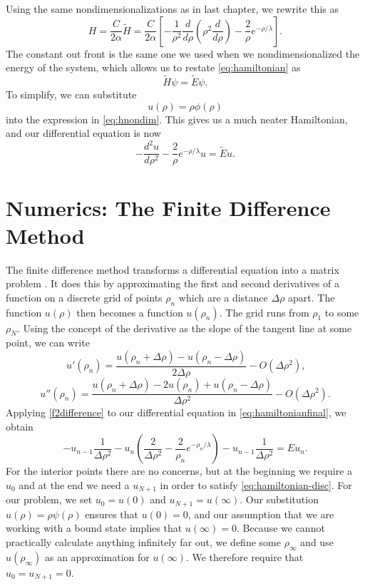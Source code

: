 \documentclass[12pt,twoside]{reedthesis}
\newcommand{\eqn}[1]{\begin{equation}#1\end{equation}}
\begin{document}
Using the same nondimensionalizations as in last chapter, we rewrite this as 
\eqn{
H=\frac{C}{2\alpha}\tilde{H} = \frac{C}{2\alpha} \left[- \frac{1}{\rho^2}\frac{d}{d\rho}\left(\rho^2\frac{d}{d\rho}\right) - \frac{2}{\rho}e^{-\rho/\lambda}\right]\mbox{.}
\label{eq:hnondim}
}
The constant out front is the same one we used when we nondimensionalized the energy of the system, which allows us to restate \eqref{eq:hamiltonian} as
\eqn{
\tilde{H}\psi = \tilde{E}\psi\mbox{.}
}
To simplify, we can substitute 
\eqn{
u(\rho)=\rho \phi(\rho)}
into the expression in \eqref{eq:hnondim}\cite{griffiths_introduction_2005}. This gives us a much neater Hamiltonian, and our differential equation is now
\eqn{
-\frac{d^2 u }{d \rho^2} - \frac{2}{\rho}e^{-\rho/\lambda}u = \tilde{E} u\mbox{.}
\label{eq:hamiltonianfinal}
}

\section{Numerics: The Finite Difference Method}
The finite difference method transforms a differential equation into a matrix problem \cite{numerical_recipes}. It does this by approximating the first and second derivatives of a function on a discrete grid of points $\rho_n$ which are a distance $\Delta \rho$ apart. The function $u(\rho)$ then becomes a function $u(\rho_n)$. The grid runs from $\rho_1$ to some $\rho_N$. Using the concept of the derivative as the slope of the tangent line at some point, we can write
\eqn{
u'(\rho_n) = \frac{u(\rho_n + \Delta \rho) - u(\rho_n - \Delta \rho)}{2 \Delta \rho} - O(\Delta{\rho}^2)\mbox{,}
\label{fdifference}
}
\eqn{
u''(\rho_n) = \frac{u(\rho_n + \Delta \rho) - 2 u(\rho_n) + u(\rho_n - \Delta \rho)}{\Delta \rho^2}-O(\Delta{\rho}^2)\mbox{.}
\label{f2difference}
}
Applying \eqref{f2difference} to our differential equation in \eqref{eq:hamiltonianfinal}, we obtain
\eqn{
-u_{n-1}\frac{1}{\Delta \rho^2} - u_n\left(\frac{2} {\Delta \rho^2} -  \frac{2}{\rho_n}e^{-\rho_n/\lambda} \right) - u_{n-1}\frac{1}{\Delta \rho^2}  = E u_n\mbox{.}
\label{eq:hamiltonian-disc}
}
For the interior points there are no concerns, but at the beginning we require a $u_0$ and at the end we need a $u_{N+1}$ in order to satisfy \eqref{eq:hamiltonian-disc}. For our problem, we set $u_0 = u(0)$  and $u_{N+1} = u(\infty)$. Our substitution $u(\rho) = \rho \psi(\rho)$ ensures that $u(0) = 0$, and our assumption that we are working with a bound state implies that $u(\infty) = 0$. Because we cannot practically calculate anything infinitely far out, we define some $\rho_{\infty}$ and use $u(\rho_{\infty})$ as an approximation for $u(\infty)$. We therefore require that $u_0 = u_{N+1} = 0$.
\end{document}
